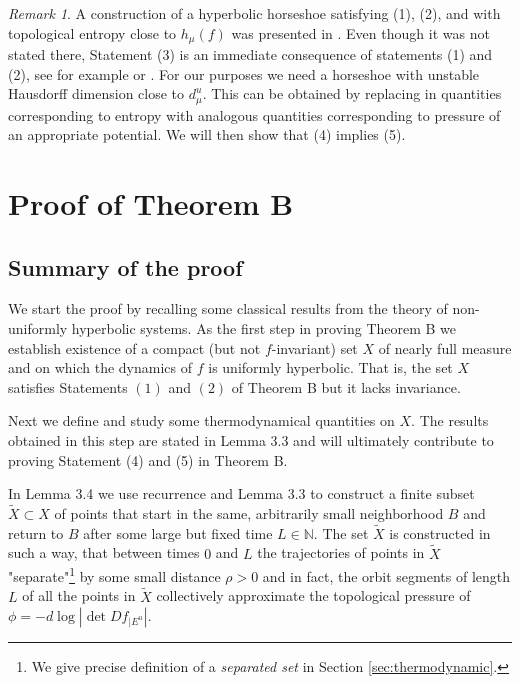 \documentclass{amsart}
\theoremstyle{plain}
\theoremstyle{definition}
\theoremstyle{remark}
\newtheorem{remark}[thm]{Remark}
\numberwithin{equation}{section}
\begin{document}
\begin{remark}\label{rmk:1}
A construction of a hyperbolic horseshoe satisfying (1), (2), and with topological entropy close to $h_{\mu}(f)$ was presented in \cite[Theorem 3.3]{ACW}.
Even though it was not stated there, Statement (3) is an immediate consequence of statements (1) and (2), see for example \cite[Theorem 5.3.2]{pesRed} or \cite[Theorem 19.1.6 and Corollary 19.1.13]{Kat}.
For our purposes we need a horseshoe with unstable Hausdorff dimension close to $d^u_{\mu}$. This can be obtained by replacing in \cite{ACW} quantities corresponding to entropy with analogous quantities corresponding to pressure of an appropriate potential.
We will then show that (4) implies (5).
\end{remark}






\section{Proof of Theorem B}\label{sec:Kat}

\subsection{Summary of the proof}
We start the proof by recalling some classical results from the theory of non-uniformly hyperbolic systems. As the first step in proving Theorem B we establish existence of a compact (but not $f$-invariant) set $X$ of nearly full measure and
on which the dynamics of $f$ is uniformly hyperbolic. That is, the set $X$ satisfies Statements $(1)$ and $(2)$ of Theorem B but it lacks invariance.

Next we define and study some thermodynamical quantities on $X$. The results obtained in this step are stated in Lemma 3.3 and will ultimately contribute to proving Statement (4) and (5) in Theorem B.

In Lemma 3.4 we use recurrence and Lemma 3.3 to construct a finite subset $\tilde{X}\subset{X}$ of points that start in the same, arbitrarily small neighborhood $B$ and return to $B$ after some large but fixed time $L\in\mathbb{N}$.
The set $\tilde{X}$ is constructed in such a way, that between times $0$ and $L$ the trajectories of points in $\tilde{X}$ "separate"\footnote{We give precise definition of a \textit{separated set} in Section \ref{sec:thermodynamic}.} 
by some small distance $\rho>0$ and in fact, the orbit segments of length $L$ of all the points in $\tilde{X}$ collectively approximate the topological pressure of
$\phi=-d \log | \det Df_{| E^u}|$. %
\end{document}
